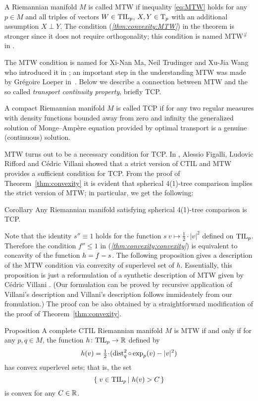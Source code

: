 A Riemannian manifold $M$ is called MTW if inequality \ref{eq:MTW} holds for any $p\in M$ and all triples of vectors $W\in \mathrm{\rm TIL}_p$, $X,Y\in \mathrm{T}_p$ with an additional assumption $X\perp Y$.
The condition (\textit{\ref{thm:convexity:MTW}}) in the theorem is stronger since it does not require orthogonality; this condition is named MTW$^{\not\perp}$ in \cite{FRV-Nec+Suf}.

The MTW condition is named for Xi-Nan Ma, Neil Trudinger and Xu-Jia Wang who introduced it in \cite{MTW};
an important step in the understanding MTW was made by Grégoire Loeper in~\cite{loeper}.
Below we describe a connection between MTW and the so called \emph{transport continuity property}, briefly TCP.

A compact Riemannian manifold $M$ is called TCP 
if for any two regular measures with density functions bounded away from zero and infinity the generalized solution of Monge--Amp\`{e}re equation provided by optimal transport 
is a genuine (continuous) solution.

MTW turns out to be a necessary condition for TCP.
In \cite{FRV-Nec+Suf}, 
Alessio Figalli, 
Ludovic Rifford 
and C\'edric Villani showed that
a strict version of CTIL and MTW provides a sufficient condition for TCP.
From the proof of Theorem~\ref{thm:convexity} it is evident that spherical 4(1)-tree comparison implies the strict version of MTW; in particular, we get the following:

\begin{thm}{Corollary}
Any Riemannian manifold satisfying spherical 4(1)-tree comparison is TCP.
\end{thm}

Note that the identity $s''\equiv1$ holds for the function $s\:v\mapsto\tfrac12\cdot|v|^2$ defined on $\mathrm{\rm TIL}_p$.
Therefore the condition $f''\le 1$ in (\textit{\ref{thm:convexity:convexity}}) is equivalent to 
concavity of the function $h\zz=f-s$.
The following proposition gives a description of the MTW condition via convexity of superlevel set of $h$.
Essentially, this proposition is just a reformulation of a synthetic description of MTW given by C\'edric Villani \cite[Proposition 2.6]{MTW+CTIL}.
(Our formulation can be proved by recursive application of Villani's description and Villani's description follows immideately from our fromulation.) 
The proof can be also obtained by a straightforward modification of the proof of Theorem~\ref{thm:convexity}.

\begin{thm}{Proposition}\label{prop:convexity}
A complete CTIL Riemannian manifold $M$ is MTW if and only if 
for any $p,q\in M$, the function $h\colon \mathrm{\rm TIL}_p\to \mathbb{R}$ defined by
\[h(v)=\tfrac12\cdot(\dist_q^2\circ\exp_p(v)-|v|^2)\] 
has convex superlevel sets; that is, the set
\[\set{v\in\TIL_p}{h(v)> C}\]
is convex for any $C\in\mathbb{R}$.
\end{thm}


